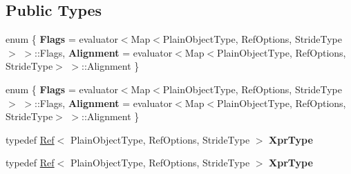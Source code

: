 \subsection*{Public Types}
\begin{DoxyCompactItemize}
\item 
\mbox{\label{struct_eigen_1_1internal_1_1evaluator_3_01_ref_3_01_plain_object_type_00_01_ref_options_00_01_stride_type_01_4_01_4_a74a3b643f607d81c1a1ca0218bf2b509}} 
enum \{ {\bfseries Flags} = evaluator$<$Map$<$Plain\+Object\+Type, Ref\+Options, Stride\+Type$>$ $>$\+:\+:Flags, 
{\bfseries Alignment} = evaluator$<$Map$<$Plain\+Object\+Type, Ref\+Options, Stride\+Type$>$ $>$\+:\+:Alignment
 \}
\item 
\mbox{\label{struct_eigen_1_1internal_1_1evaluator_3_01_ref_3_01_plain_object_type_00_01_ref_options_00_01_stride_type_01_4_01_4_adf1caf116d41e8dc311a94852ab5497c}} 
enum \{ {\bfseries Flags} = evaluator$<$Map$<$Plain\+Object\+Type, Ref\+Options, Stride\+Type$>$ $>$\+:\+:Flags, 
{\bfseries Alignment} = evaluator$<$Map$<$Plain\+Object\+Type, Ref\+Options, Stride\+Type$>$ $>$\+:\+:Alignment
 \}
\item 
\mbox{\label{struct_eigen_1_1internal_1_1evaluator_3_01_ref_3_01_plain_object_type_00_01_ref_options_00_01_stride_type_01_4_01_4_a49f98301ac153b880b54008edd822e9e}} 
typedef \hyperlink{group___core___module_class_eigen_1_1_ref}{Ref}$<$ Plain\+Object\+Type, Ref\+Options, Stride\+Type $>$ {\bfseries Xpr\+Type}
\item 
\mbox{\label{struct_eigen_1_1internal_1_1evaluator_3_01_ref_3_01_plain_object_type_00_01_ref_options_00_01_stride_type_01_4_01_4_a49f98301ac153b880b54008edd822e9e}} 
typedef \hyperlink{group___core___module_class_eigen_1_1_ref}{Ref}$<$ Plain\+Object\+Type, Ref\+Options, Stride\+Type $>$ {\bfseries Xpr\+Type}
\end{DoxyCompactItemize}
